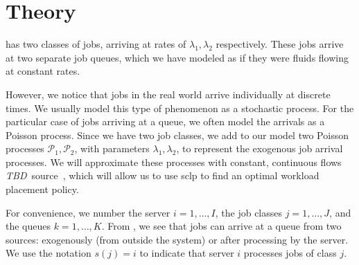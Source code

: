 \documentclass[11pt,a4paper,titlepage]{article}
\newcommand\tbd{{\color{orange}\textit{TBD}}}
\theoremstyle{definition}
\begin{document}
%

\section{Theory}
\label{sec:theory}

 has two classes of jobs,
arriving at rates of $\lambda_1, \lambda_2$ respectively.
These jobs arrive at two separate job queues,
which we have modeled as if they were fluids flowing at constant rates.

However, we notice that jobs in the real world arrive individually at discrete times.
We usually model this type of phenomenon as a stochastic process.
For the particular case of jobs arriving at a queue,
we often model the arrivals as a Poisson process.
Since we have two job classes,
we add to our model two Poisson processes $\mathcal{P}_1,\mathcal{P}_2$,
with parameters $\lambda_1,\lambda_2$,
to represent the exogenous job arrival processes.
We will approximate these processes with constant,
continuous flows \tbd{~source~},
which will allow us to use \gls{sclp} to find an optimal workload placement policy.

For convenience,
we number the server $i=1,\ldots,I$,
the job classes $j=1,\ldots,J$,
and the queues $k=1,\ldots,K$.
From ,
we see that jobs can arrive at a queue from two sources:
exogenously (from outside the system) or after processing by the server.
We use the notation $s(j)=i$ to indicate that server $i$ processes jobs of class $j$.
\end{document}
